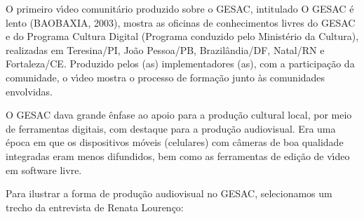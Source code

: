 \documentclass[
12pt,		%
openright,	%
twoside,  %
a4paper,			%
chapter=TITLE,		%
english,			%
french,				%
spanish,			%
brazil				%
]{USPSC-classe/USPSC}
\begin{document}
\noindent\begin{center}\mbox{\centering{}}\end{center}


O primeiro v\'{\i}deo comunit\'ario produzido sobre o GESAC, intitulado \textquotedbl  O GESAC \'e lento \textquotedbl   (BAOBAXIA, 2003),  mostra as oficinas de conhecimentos livres do GESAC e do Programa Cultura Digital (Programa conduzido pelo Minist\'erio da Cultura), realizadas em Teresina/PI, Jo\~ao Pessoa/PB, Brazil\^andia/DF, Natal/RN e Fortaleza/CE. Produzido pelos (as) implementadores (as), com a participa\c{c}\~ao da comunidade, o v\'{\i}deo mostra o processo de forma\c{c}\~ao junto \`as comunidades envolvidas.

















O GESAC dava grande \^enfase ao apoio para a produ\c{c}\~ao cultural local, por meio de ferramentas digitais, com destaque para a produ\c{c}\~ao audiovisual. Era uma \'epoca em que os dispositivos m\'oveis (celulares) com c\^ameras de boa qualidade integradas eram menos difundidos, bem como as ferramentas de edi\c{c}\~ao de v\'{\i}deo em software livre.

















Para ilustrar a forma de produ\c{c}\~ao audiovisual no GESAC, selecionamos um trecho da entrevista de Renata Louren\c{c}o:
\end{document}
